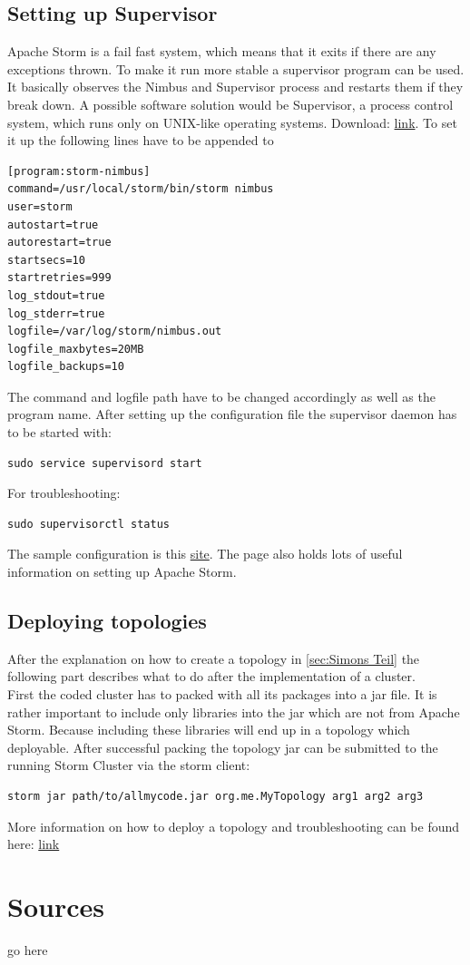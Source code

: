 \documentclass[12pt,a4paper]{article}
\begin{document}
\subsection{Setting up Supervisor}
Apache Storm is a fail fast system, which means that it exits if there are any exceptions thrown. To make it run more stable a supervisor program can be used. It basically observes the Nimbus and Supervisor process and restarts them if they break down. A possible software solution would be Supervisor, a process control system, which runs only on UNIX-like operating systems. Download: \href{http://supervisord.org/#}{link}.
To set it up the following lines have to be appended to 
\begin{verbatim}
[program:storm-nimbus]
command=/usr/local/storm/bin/storm nimbus
user=storm
autostart=true
autorestart=true
startsecs=10
startretries=999
log_stdout=true
log_stderr=true
logfile=/var/log/storm/nimbus.out
logfile_maxbytes=20MB
logfile_backups=10
\end{verbatim}
The command and logfile path have to be changed accordingly as well as the program name. After setting up the configuration file the supervisor daemon has to be started with: 
\begin{verbatim}
sudo service supervisord start
\end{verbatim}
For troubleshooting:
\begin{verbatim}
sudo supervisorctl status
\end{verbatim}
The sample configuration is this \href{http://www.michael-noll.com/tutorials/running-multi-node-storm-cluster/#install-supervisord}{site}. The page also holds lots of useful information on setting up Apache Storm.
\subsection{Deploying topologies}
After the explanation on how to create a topology in \ref{sec:Simons Teil} the following part describes what to do after the implementation of a cluster.\\
First the coded cluster has to packed with all its packages into a jar file. It is rather important to include only libraries into the jar which are not from Apache Storm. Because including these libraries will end up in a topology which deployable. After successful packing the topology jar can be submitted to the running Storm Cluster via the storm client:
\begin{verbatim}
storm jar path/to/allmycode.jar org.me.MyTopology arg1 arg2 arg3
\end{verbatim}
More information on how to deploy a topology and troubleshooting can be found here: \href{http://storm.apache.org/documentation/Running-topologies-on-a-production-cluster.html}{link}
\section{Sources}
go here
\end{document}
